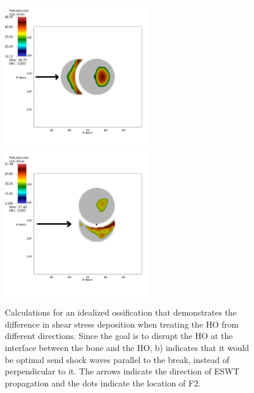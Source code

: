 \documentclass{article}
\begin{document}
\begin{figure}[h!]
\begin{center}
\includegraphics[height=2.5in]{ossification/idealoss_shear_rotate_2D_annotate.png}\hspace{5mm}
\includegraphics[height=2.5in]{ossification/idealoss_shear_2D_annotate.png}
\caption{Calculations for an idealized ossification that demonstrates the difference in shear stress deposition when treating the HO from different directions.  Since the goal is to disrupt the HO at the interface between the bone and the HO, b) indicates that it would be optimal send shock waves parallel to the break, instead of perpendicular to it.  The arrows indicate the direction of ESWT propagation and the dots indicate the location of F2.}
\label{fig:broken_ho_shear}
\end{center}
\end{figure}
\end{document}
